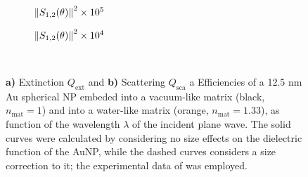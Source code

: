  
\begin{figure}[h!]
	\def\svgwidth{1\textwidth} \small
\vspace*{3.25em}
\hspace*{-6.5em}
\begin{subfigure}{.49\textwidth}\caption{$\norm{S_{1,2}(\theta)}^2\times 10^5$}\label{fig:Mieefficiencies:a}\end{subfigure}
\begin{subfigure}{.49\textwidth}\caption{$\norm{S_{1,2}(\theta)}^2\times 10^4$}\label{fig:Mieefficiencies:b}\end{subfigure}
\vspace*{-6.25em}\\
\vspace*{-2em}
\caption[Extinction and Scattering Corss Section of a 12.5 nm Au spherical NP embeded into a vacuum- and into a waterlike environment]{ \textbf{a)} Extinction $Q_\text{ext}$ and \textbf{b)} Scattering $Q_\text{sca}$ a Efficiencies of a 12.5 nm Au spherical NP embeded into a vacuum-like matrix (black, $n_\text{mat} = 1$)  and into a water-like matrix (orange, $n_\text{mat} = 1.33$), as function of  the wavelength $\lambda$ of the incident plane wave.  The solid curves were calculated by considering no size effects on the dielectric function of the AuNP, while the dashed curves considers a size correction to it; the experimental data of \citeauthor{johnson_optical_1972} \cite{johnson_optical_1972} was employed.} 
 \end{figure}

